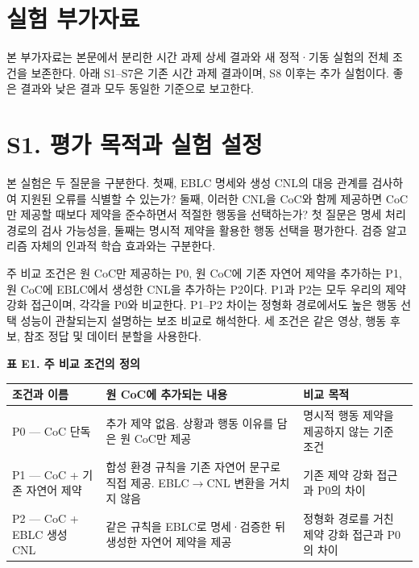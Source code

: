 \documentclass[11pt,a4paper]{article}
\begin{document}
\section*{실험 부가자료}

본 부가자료는 본문에서 분리한 시간 과제 상세 결과와 새 정적·기동 실험의 전체 조건을 보존한다. 아래 S1–S7은 기존 시간 과제 결과이며, S8 이후는 추가 실험이다. 좋은 결과와 낮은 결과 모두 동일한 기준으로 보고한다.\par

\section*{S1. 평가 목적과 실험 설정}

본 실험은 두 질문을 구분한다. 첫째, EBLC 명세와 생성 CNL의 대응 관계를 검사하여 지원된 오류를 식별할 수 있는가? 둘째, 이러한 CNL을 CoC와 함께 제공하면 CoC만 제공할 때보다 제약을 준수하면서 적절한 행동을 선택하는가? 첫 질문은 명세 처리 경로의 검사 가능성을, 둘째는 명시적 제약을 활용한 행동 선택을 평가한다. 검증 알고리즘 자체의 인과적 학습 효과와는 구분한다.\par

주 비교 조건은 원 CoC만 제공하는 P0, 원 CoC에 기존 자연어 제약을 추가하는 P1, 원 CoC에 EBLC에서 생성한 CNL을 추가하는 P2이다. P1과 P2는 모두 우리의 제약 강화 접근이며, 각각을 P0와 비교한다. P1–P2 차이는 정형화 경로에서도 높은 행동 선택 성능이 관찰되는지 설명하는 보조 비교로 해석한다. 세 조건은 같은 영상, 행동 후보, 참조 정답 및 데이터 분할을 사용한다.\par

\par\medskip\noindent\begin{minipage}{\linewidth}
\textbf{표 E1. 주 비교 조건의 정의}\par

\par\medskip\noindent\begin{minipage}{\linewidth}\small
\begin{tabular}{@{}>{\raggedright\arraybackslash}p{}>{\raggedright\arraybackslash}p{}>{\raggedright\arraybackslash}p{}@{}}
\toprule
\textbf{조건과 이름} & \textbf{원 CoC에 추가되는 내용} & \textbf{비교 목적} \\
\midrule
P0 — CoC 단독 & 추가 제약 없음. 상황과 행동 이유를 담은 원 CoC만 제공 & 명시적 행동 제약을 제공하지 않는 기준 조건 \\
P1 — CoC + 기존 자연어 제약 & 합성 환경 규칙을 기존 자연어 문구로 직접 제공. EBLC\ensuremath{\rightarrow}CNL 변환을 거치지 않음 & 기존 제약 강화 접근과 P0의 차이 \\
P2 — CoC + EBLC 생성 CNL & 같은 규칙을 EBLC로 명세·검증한 뒤 생성한 자연어 제약을 제공 & 정형화 경로를 거친 제약 강화 접근과 P0의 차이 \\
\bottomrule\end{tabular}\end{minipage}\par\medskip
\end{minipage}\par\medskip
\end{document}
